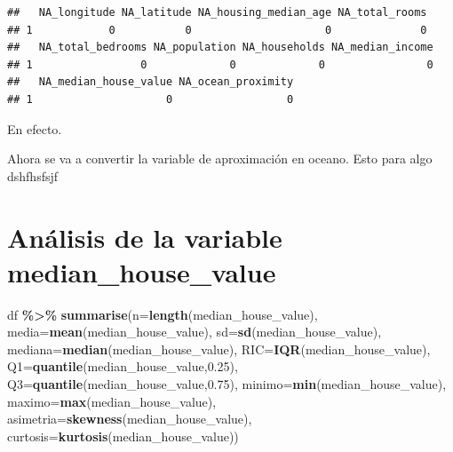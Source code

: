 \documentclass[
]{book}
\newenvironment{Shaded}{\begin{snugshade}}{\end{snugshade}}
\newcommand{\AttributeTok}[1]{\textcolor[rgb]{0.13,0.29,0.53}{#1}}
\newcommand{\FloatTok}[1]{\textcolor[rgb]{0.00,0.00,0.81}{#1}}
\newcommand{\FunctionTok}[1]{\textcolor[rgb]{0.13,0.29,0.53}{\textbf{#1}}}
\newcommand{\NormalTok}[1]{#1}
\newcommand{\OtherTok}[1]{\textcolor[rgb]{0.56,0.35,0.01}{#1}}
\newcommand{\SpecialCharTok}[1]{\textcolor[rgb]{0.81,0.36,0.00}{\textbf{#1}}}
\begin{document}
\begin{verbatim}
##   NA_longitude NA_latitude NA_housing_median_age NA_total_rooms
## 1            0           0                     0              0
##   NA_total_bedrooms NA_population NA_households NA_median_income
## 1                 0             0             0                0
##   NA_median_house_value NA_ocean_proximity
## 1                     0                  0
\end{verbatim}

En efecto.

Ahora se va a convertir la variable de aproximación en oceano. Esto para algo dshfhsfsjf

\begin{Shaded}
\end{Shaded}

\chapter{Análisis de la variable median\_house\_value}\label{anuxe1lisis-de-la-variable-median_house_value}

\begin{Shaded}
\begin{Highlighting}[]
\NormalTok{df }\SpecialCharTok{\%\textgreater{}\%} 
  \FunctionTok{summarise}\NormalTok{(}\AttributeTok{n=}\FunctionTok{length}\NormalTok{(median\_house\_value),}
                 \AttributeTok{media=}\FunctionTok{mean}\NormalTok{(median\_house\_value),}
                 \AttributeTok{sd=}\FunctionTok{sd}\NormalTok{(median\_house\_value),}
                 \AttributeTok{mediana=}\FunctionTok{median}\NormalTok{(median\_house\_value),}
                 \AttributeTok{RIC=}\FunctionTok{IQR}\NormalTok{(median\_house\_value),}
                 \AttributeTok{Q1=}\FunctionTok{quantile}\NormalTok{(median\_house\_value,}\FloatTok{0.25}\NormalTok{),}
                 \AttributeTok{Q3=}\FunctionTok{quantile}\NormalTok{(median\_house\_value,}\FloatTok{0.75}\NormalTok{),}
                 \AttributeTok{minimo=}\FunctionTok{min}\NormalTok{(median\_house\_value),}
                 \AttributeTok{maximo=}\FunctionTok{max}\NormalTok{(median\_house\_value),}
                 \AttributeTok{asimetria=}\FunctionTok{skewness}\NormalTok{(median\_house\_value),}
                 \AttributeTok{curtosis=}\FunctionTok{kurtosis}\NormalTok{(median\_house\_value))}
\end{Highlighting}
\end{Shaded}
\end{document}

